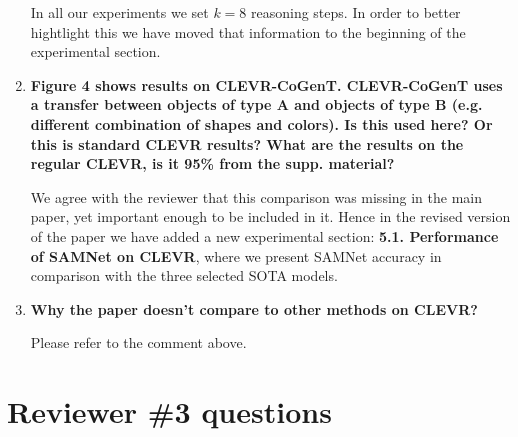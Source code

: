 \documentclass[10pt,twocolumn,letterpaper]{article}
\begin{document}
\begin{enumerate}
  In all our experiments we set $k=8$ reasoning steps. In order to better hightlight this we have moved that information to the beginning of the experimental section.
  
  \item \textbf{Figure 4 shows results on CLEVR-CoGenT. CLEVR-CoGenT uses a transfer between objects of type A and objects of type B (e.g. different combination of shapes and colors). Is this used here? Or this is standard CLEVR results? What are the results on the regular CLEVR, is it 95\% from the supp. material?}
  
  We agree with the reviewer that this comparison was missing in the main paper, yet important enough to be included in it. Hence in the revised version of the paper we have added a new experimental section: \textbf{5.1. Performance of SAMNet on CLEVR}, where we present SAMNet accuracy in comparison with the three selected SOTA models.

    \item \textbf{Why the paper doesn't compare to other methods on CLEVR?}

	Please refer to the comment above.
	  
\end{enumerate}

\section{Reviewer \#3 questions}
\end{document}
